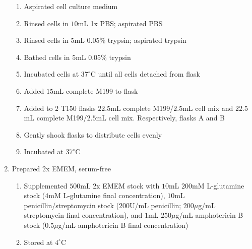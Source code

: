 \begin{enumerate}
			\begin{enumerate}
				\item Aspirated cell culture medium
				\item Rinsed cells in $10$mL 1x PBS; aspirated PBS
				\item Rinsed cells in $5$mL $0.05$\% trypsin; aspirated trypsin
				\item Bathed cells in $5$mL $0.05$\% trypsin
				\item Incubated cells at $37^{\circ}$C until all cells detached from flask
				\item Added $15$mL complete M199 to flask
				\item Added to $2$ T150 flasks $22.5$mL complete M199/$2.5$mL cell mix and $22.5$mL complete M199/$2.5$mL cell mix. Respectively, flasks A and B
				\item Gently shook flasks to distribute cells evenly
				\item Incubated at $37^{\circ}$C
			\end{enumerate}
		\item Prepared 2x EMEM, serum-free
			\begin{enumerate}
				\item Supplemented $500$mL 2x EMEM stock with $10$mL $200$mM L-glutamine stock ($4$mM L-glutamine final concentration), $10$mL penicillin/streptomycin stock ($200$U/mL penicillin; $200\mu$g/mL streptomycin final concentration), and $1$mL $250\mu$g/mL amphotericin B stock ($0.5\mu$g/mL amphotericin B final concentration)
				\item Stored at $4^{\circ}$C
			\end{enumerate}
\end{enumerate}

